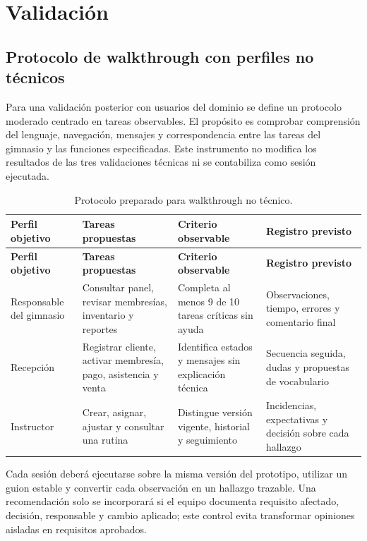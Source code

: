 \documentclass[11pt,a4paper]{article}
\begin{document}
\section{Validación}


\subsection{Protocolo de walkthrough con perfiles no técnicos}
Para una validación posterior con usuarios del dominio se define un protocolo moderado centrado en tareas observables. El propósito es comprobar comprensión del lenguaje, navegación, mensajes y correspondencia entre las tareas del gimnasio y las funciones especificadas. Este instrumento no modifica los resultados de las tres validaciones técnicas ni se contabiliza como sesión ejecutada.

\begin{longtable}{|p{2.7cm}|p{5.2cm}|p{4.2cm}|p{3.2cm}|}
\caption{Protocolo preparado para walkthrough no técnico.}\\\hline
\textbf{Perfil objetivo} & \textbf{Tareas propuestas} & \textbf{Criterio observable} & \textbf{Registro previsto}\\\hline\endfirsthead
\hline\textbf{Perfil objetivo} & \textbf{Tareas propuestas} & \textbf{Criterio observable} & \textbf{Registro previsto}\\\hline\endhead
Responsable del gimnasio & Consultar panel, revisar membresías, inventario y reportes & Completa al menos 9 de 10 tareas críticas sin ayuda & Observaciones, tiempo, errores y comentario final\\\hline
Recepción & Registrar cliente, activar membresía, pago, asistencia y venta & Identifica estados y mensajes sin explicación técnica & Secuencia seguida, dudas y propuestas de vocabulario\\\hline
Instructor & Crear, asignar, ajustar y consultar una rutina & Distingue versión vigente, historial y seguimiento & Incidencias, expectativas y decisión sobre cada hallazgo\\\hline
\end{longtable}

Cada sesión deberá ejecutarse sobre la misma versión del prototipo, utilizar un guion estable y convertir cada observación en un hallazgo trazable. Una recomendación solo se incorporará si el equipo documenta requisito afectado, decisión, responsable y cambio aplicado; este control evita transformar opiniones aisladas en requisitos aprobados.
\end{document}
